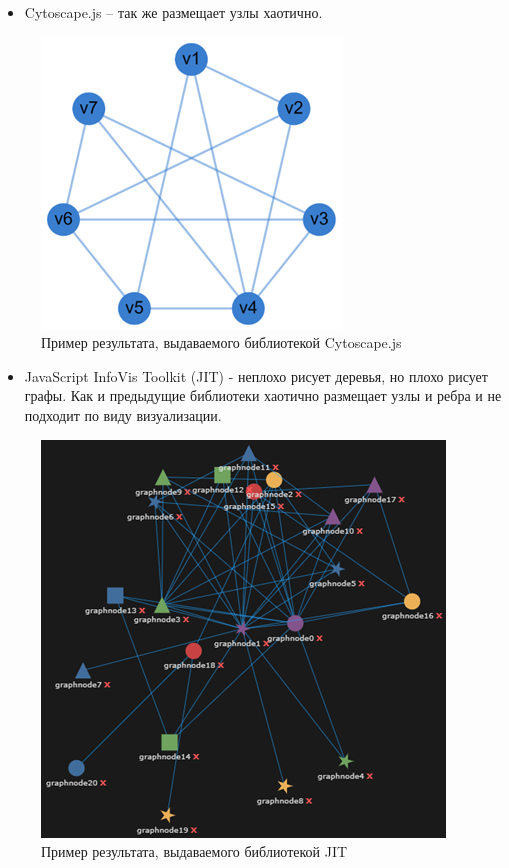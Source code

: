 \begin{itemize}
\item Cytoscape.js – так же размещает узлы хаотично.
\end{itemize}
\begin{figure}[ht!] 
	\center
	\includegraphics [scale=0.27] {my_folder/images/my/15}
	\caption{Пример результата, выдаваемого библиотекой Cytoscape.js} 
	\label{fig:15}  
\end{figure}
\begin{itemize}
\item JavaScript InfoVis Toolkit (JIT) - неплохо рисует деревья, но плохо рисует графы. Как и предыдущие библиотеки хаотично размещает узлы и ребра и не подходит по виду визуализации.
\end{itemize}
\begin{figure}[ht!] 
	\center
	\includegraphics [scale=0.27] {my_folder/images/my/16}
	\caption{Пример результата, выдаваемого библиотекой JIT} 
	\label{fig:16}  
\end{figure}

